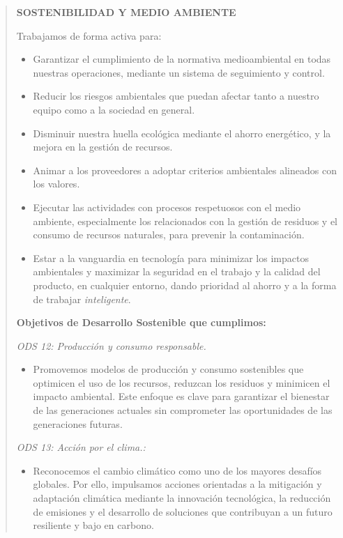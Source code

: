 \documentclass[11.5pt]{article}
\begin{document}
	\begin{quotation}
		\textbf{SOSTENIBILIDAD Y MEDIO AMBIENTE}
		
			Trabajamos de forma activa para:
			
		
		\begin{itemize}
			\item 		Garantizar el cumplimiento de la normativa medioambiental en todas nuestras operaciones, mediante un sistema de seguimiento y control.
			\item 		Reducir los riesgos ambientales que puedan afectar tanto a nuestro equipo como a la sociedad en general.
			\item 		Disminuir nuestra huella ecológica mediante el ahorro energético, y la mejora en la gestión de recursos.
			\item 		Animar a los proveedores a adoptar criterios ambientales alineados con los valores.
			\item 		Ejecutar las actividades con procesos respetuosos con el medio ambiente, especialmente los relacionados con la gestión de residuos y el consumo de recursos naturales, para prevenir la contaminación.
			\item 		Estar a la vanguardia en tecnología para minimizar los impactos ambientales y maximizar la seguridad en el trabajo y la calidad del producto, en cualquier entorno, dando prioridad al ahorro y a la forma de trabajar \textit{inteligente}.
		\end{itemize}
		
		\textbf{Objetivos de Desarrollo Sostenible que cumplimos:}
		
		\textit{ODS 12: Producción y consumo responsable.}
		\begin{itemize}
			\item Promovemos modelos de producción y consumo sostenibles que optimicen el uso de los recursos, reduzcan los residuos y minimicen el impacto ambiental. Este enfoque es clave para garantizar el bienestar de las generaciones actuales sin comprometer las oportunidades de las generaciones futuras.
		\end{itemize}
		
		\textit{ODS 13: Acción por el clima.:}
		\begin{itemize}
			\item Reconocemos el cambio climático como uno de los mayores desafíos globales. Por ello, impulsamos acciones orientadas a la mitigación y adaptación climática mediante la innovación tecnológica, la reducción de emisiones y el desarrollo de soluciones que contribuyan a un futuro resiliente y bajo en carbono.
		\end{itemize}
	\end{quotation}
	
\end{document}
